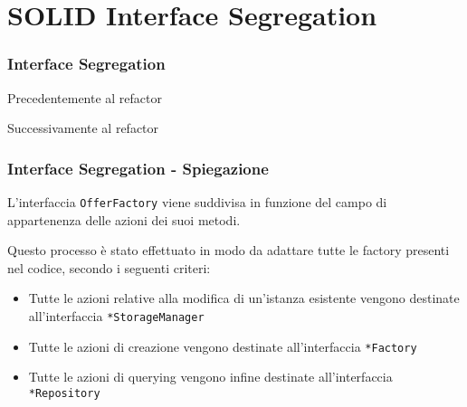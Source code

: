 \section{SOLID Interface Segregation}
\begin{frame}
    \frametitle{Interface Segregation}

    \begin{minipage}{.48\textwidth}
        Precedentemente al refactor
        \begin{figure}
            \centering
        \end{figure}
    \end{minipage}
    \hfill
    \begin{minipage}{.48\textwidth}
        Successivamente al refactor
        \begin{figure}
            \centering
        \end{figure}
    \end{minipage}
\end{frame}

\begin{frame}
    \frametitle{Interface Segregation - Spiegazione}
    L'interfaccia \texttt{OfferFactory} viene suddivisa in funzione del campo di appartenenza delle azioni dei suoi metodi.

    Questo processo è stato effettuato in modo da adattare tutte le factory presenti nel codice, secondo i seguenti criteri:
    \begin{itemize}
        \item<1-> Tutte le azioni relative alla modifica di un'istanza esistente vengono destinate all'interfaccia \texttt{*StorageManager}
        \item<2-> Tutte le azioni di creazione vengono destinate all'interfaccia \texttt{*Factory}
        \item <3-> Tutte le azioni di querying vengono infine destinate all'interfaccia \texttt{*Repository}
    \end{itemize}
\end{frame}
